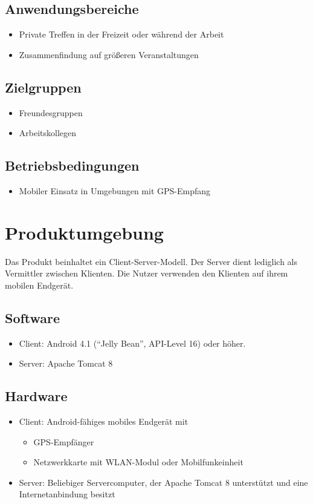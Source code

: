 \documentclass[parskip=full,11pt]{scrartcl}
\begin{document}
\subsection{Anwendungsbereiche}
\begin{itemize}
    \item Private Treffen in der Freizeit oder während der Arbeit
    \item Zusammenfindung auf größeren Veranstaltungen
\end{itemize}

\subsection{Zielgruppen}
\begin{itemize}
    \item Freundesgruppen
    \item Arbeitskollegen
\end{itemize}

\subsection{Betriebsbedingungen}
\begin{itemize}
    \item Mobiler Einsatz in Umgebungen mit GPS-Empfang
\end{itemize}

\section{Produktumgebung}
Das Produkt beinhaltet ein Client-Server-Modell.
Der Server dient lediglich als Vermittler zwischen Klienten.
Die Nutzer verwenden den Klienten auf ihrem mobilen Endgerät.
\subsection{Software}
\begin{itemize}
    \item Client: Android 4.1 (\enquote{Jelly Bean}, API-Level 16) oder
        höher.
    \item Server: Apache Tomcat 8
\end{itemize}

\subsection{Hardware}
\begin{itemize}
    \item Client: Android-fähiges mobiles Endgerät mit
        \begin{itemize}
            \item GPS-Empfänger
            \item Netzwerkkarte mit WLAN-Modul oder Mobilfunkeinheit
        \end{itemize}
    \item Server: Beliebiger Servercomputer, der Apache Tomcat 8 unterstützt
        und eine Internetanbindung besitzt
\end{itemize}
\end{document}

